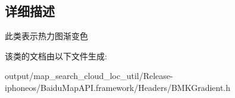 \subsection{详细描述}
此类表示热力图渐变色 

该类的文档由以下文件生成\+:\begin{DoxyCompactItemize}
\item 
output/map\+\_\+search\+\_\+cloud\+\_\+loc\+\_\+util/\+Release-\/iphoneos/\+Baidu\+Map\+A\+P\+I.\+framework/\+Headers/B\+M\+K\+Gradient.\+h\end{DoxyCompactItemize}
